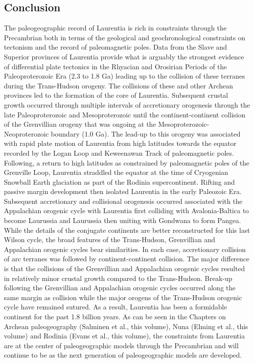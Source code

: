 \documentclass[11pt,letterpaper]{article}
\begin{document}
\subsection{Conclusion}

The paleogeographic record of Laurentia is rich in constraints through the Precambrian both in terms of the geological and geochronological constraints on tectonism and the record of paleomagnetic poles. Data from the Slave and Superior provinces of Laurentia provide what is arguably the strongest evidence of differential plate tectonics in the Rhyacian and Orosirian Periods of the Paleoproterozoic Era (2.3 to 1.8 Ga) leading up to the collision of these terranes during the Trans-Hudson orogeny. The collisions of these and other Archean provinces led to the formation of the core of Laurentia. Subsequent crustal growth occurred through multiple intervals of accretionary orogenesis through the late Paleoproterozoic and Mesoproterozoic until the continent-continent collision of the Grenvillian orogeny that was ongoing at the Mesoproterozoic-Neoproterozoic boundary (1.0 Ga). The lead-up to this orogeny was associated with rapid plate motion of Laurentia from high latitudes towards the equator recorded by the Logan Loop and Keweenawan Track of paleomagnetic poles. Following, a return to high latitudes as constrained by paleomagnetic poles of the Grenville Loop, Laurentia straddled the equator at the time of Cryogenian Snowball Earth glaciation as part of the Rodinia supercontinent. Rifting and passive margin development then isolated Laurentia in the early Paleozoic Era. Subsequent accretionary and collisional orogenesis occurred associated with the Appalachian orogenic cycle with Laurentia first colliding with Avalonia-Baltica to become Laurussia and Laurussia then uniting with Gondwana to form Pangea. While the details of the conjugate continents are better reconstructed for this last Wilson cycle, the broad features of the Trans-Hudson, Grenvillian and Appalachian orogenic cycles bear similarities. In each case, accretionary collision of arc terranes was followed by continent-continent collision. The major difference is that the collisions of the Grenvillian and Appalachian orogenic cycles resulted in relatively minor crustal growth compared to the Trans-Hudson. Break-up following the Grenvillian and Appalachian orogenic cycles occurred along the same margin as collision while the major orogens of the Trans-Hudson orogenic cycle have remained sutured. As a result, Laurentia has been a formidable continent for the past 1.8 billion years. As can be seen in the Chapters on Archean paleogeography (Salminen et al., this volume), Nuna (Elming et al., this volume) and Rodinia (Evans et al., this volume), the constraints from Laurentia are at the center of paleogeographic models through the Precambrian and will continue to be as the next generation of paleogeographic models are developed.
\end{document}
